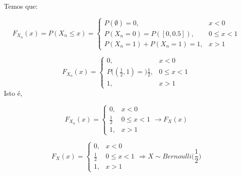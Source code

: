 \documentclass[a4paper,12pt]{article}
\begin{document}
Temos que:

$$F_{X_n}(x) = P(X_n\le x)=\begin{cases}
P(\emptyset)=0, & x<0\\
 P(X_n=0)=P([0,0.5]), & 0\le x <1\\
 P(X_n=1)+P(X_n=1)=1, & x>1
\end{cases} $$

$$
F_{X_n}(x) =\begin{cases}
0, & x<0\\
P\bigg((\frac{1}{2},1)=
\bigg)\frac{1}{2}, & 0\le x <1\\
1, & x>1
\end{cases}
$$
Isto é,

$$
F_  {X_n}(x) = \begin{cases}
0, & x<0\\
\frac{1}{2} & 0\le x<1\\
1, & x>1
\end{cases}
\longrightarrow F_X(x)
$$

$$
F_ X(x) = \begin{cases}
0, & x<0\\
\frac{1}{2} & 0\le x<1\\
1, & x>1
\end{cases}
\Rightarrow X \sim Bernoulli\bigg(\frac{1}{2}\bigg)
$$
\end{document}
